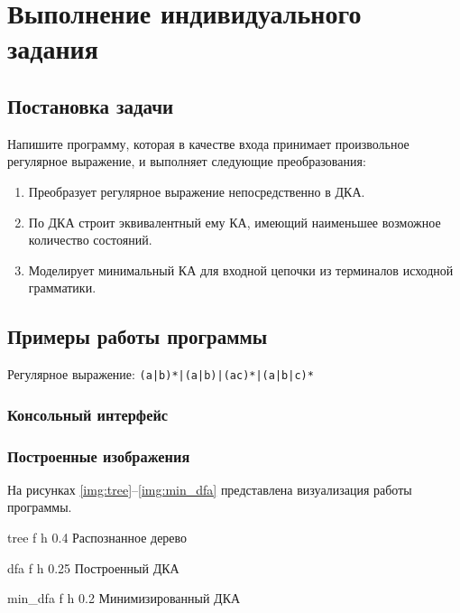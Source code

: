 \chapter{Выполнение индивидуального задания}

\section{Постановка задачи}

Напишите программу, которая в качестве входа принимает произвольное регулярное выражение, и выполняет следующие преобразования:
\begin{enumerate}
\item Преобразует регулярное выражение непосредственно в ДКА.
\item По ДКА строит эквивалентный ему КА, имеющий наименьшее возможное количество состояний.
\item Моделирует минимальный КА для входной цепочки из терминалов исходной грамматики.
\end{enumerate}

\section{Примеры работы программы}

Регулярное выражение: \texttt{(a|b)*|(a|b)|(ac)*|(a|b|c)*}

\subsection{Консольный интерфейс}


\clearpage


\subsection{Построенные изображения}

На рисунках \ref{img:tree}--\ref{img:min_dfa} представлена визуализация работы программы.

    {tree}
    {f}
    {h} 
    {0.4\textwidth}
    {Распознанное дерево}

    {dfa}
    {f}
    {h} 
    {0.25\textwidth}
    {Построенный ДКА}

    {min_dfa}
    {f}
    {h} 
    {0.2\textwidth}
    {Минимизированный ДКА}

